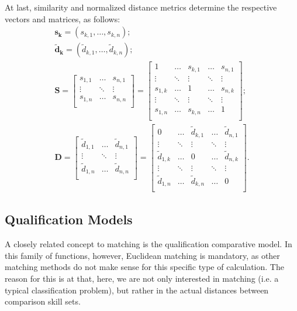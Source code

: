\documentclass{elsarticle} %
\begin{document}
At last, similarity and normalized distance metrics determine the respective vectors and matrices, as follows:
\begin{gather}
    \boldsymbol{s_k} = (s_{k,1}, \dots, s_{k,n})
    ;\\
    \boldsymbol{\tilde{d}_k} = (\tilde{d}_{k,1}, \dots, \tilde{d}_{k,n})
    ;\\
    \textbf{S} =
    \begin{bmatrix}
        s_{1,1} & \hdots & s_{n,1}\\
        \vdots & \ddots & \vdots\\
        s_{1,n} & \hdots & s_{n,n}\\
    \end{bmatrix} = 
    \begin{bmatrix}
        1 & \hdots & s_{k,1} & \hdots & s_{n,1}\\
        \vdots & \ddots & \vdots & \ddots & \vdots\\
        s_{1,k} & \hdots & 1 & \hdots & s_{n,k}\\
        \vdots & \ddots & \vdots & \ddots & \vdots\\
        s_{1,n} & \hdots & s_{k,n} & \hdots & 1\\
    \end{bmatrix}
    ;\\
    \textbf{D} =
    \begin{bmatrix}
        \tilde{d}_{1,1} & \hdots & \tilde{d}_{n,1}\\
        \vdots & \ddots & \vdots\\
        \tilde{d}_{1,n} & \hdots & \tilde{d}_{n,n}\\
    \end{bmatrix} = 
    \begin{bmatrix}
        0 & \hdots & \tilde{d}_{k,1} & \hdots & \tilde{d}_{n,1}\\
        \vdots & \ddots & \vdots & \ddots & \vdots\\
        \tilde{d}_{1,k} & \hdots & 0 & \hdots & \tilde{d}_{n,k}\\
        \vdots & \ddots & \vdots & \ddots & \vdots\\
        \tilde{d}_{1,n} & \hdots & \tilde{d}_{k,n} & \hdots & 0\\
    \end{bmatrix}
    .
\end{gather}

\subsection{Qualification Models}
A closely related concept to matching is the qualification comparative model. In this family of functions, however, Euclidean matching is mandatory, as other matching methods do not make sense for this specific type of calculation. The reason for this is at that, here, we are not only interested in matching (i.e. a typical classification problem), but rather in the actual distances between comparison skill sets.
\end{document}

